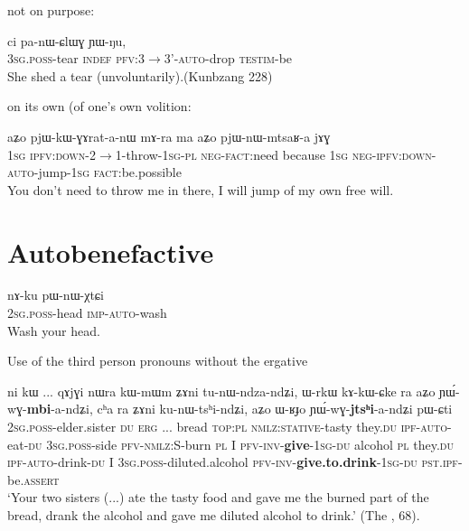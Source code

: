 \documentclass[oldfontcommands,oneside,a4paper,11pt]{article}
\newcommand{\ipa}[1]{{\phon \mbox{#1}}} %
\begin{document}
not on purpose:


\begin{exe}
\ex
\gll \ipa{ɯ-qom} 	\ipa{ci} 	\ipa{pa-nɯ-ɕlɯɣ} 	\ipa{ɲɯ-ŋu,} \\
\textsc{3sg.poss}-tear \textsc{indef} \textsc{pfv:3$\rightarrow$3'-auto}-drop \textsc{testim}-be \\
\glt She shed a tear (unvoluntarily).(Kunbzang 228)
\end{exe}


on its own (of one's own volition:

\begin{exe}
\ex
\gll 
\ipa{aʑo} 	\ipa{pjɯ-kɯ-ɣɤrat-a-nɯ} 	\ipa{mɤ-ra} 	\ipa{ma} 	\ipa{aʑo} 	\ipa{pjɯ-nɯ-mtsaʁ-a} 	\ipa{jɤɣ} \\
\textsc{1sg} \textsc{ipfv:down}-2$\rightarrow$1-throw-\textsc{1sg-pl} \textsc{neg-fact}:need because \textsc{1sg} \textsc{neg-ipfv:down-auto}-jump-\textsc{1sg} \textsc{fact}:be.possible \\
\glt You don't need to throw me in there, I will jump of my own free will.
\end{exe}


\section{Autobenefactive}

\begin{exe}
\ex
\gll 
\ipa{nɤ-ku} 	\ipa{pɯ-nɯ-χtɕi} \\
\textsc{2sg.poss}-head \textsc{imp-auto}-wash \\
\glt Wash your head.
\end{exe}

Use of the third person pronouns without the ergative

   \begin{exe}
\ex \label{ex:secundative}
\gll  \ipa{nɤ-pi}   	\ipa{ni}   	\ipa{kɯ}   	...   	\ipa{qɤjɣi}   	\ipa{nɯra}   	\ipa{kɯ-mɯm}   	\ipa{ʑɤni}   	\ipa{tu-nɯ-ndza-ndʑi,}   	\ipa{ɯ-rkɯ}   	\ipa{kɤ-kɯ-ɕke}   	\ipa{ra}   	\ipa{aʑo}   	\ipa{ɲɯ́-wɣ-\textbf{mbi}-a-ndʑi,}   	\ipa{cʰa}   	\ipa{ra}   	\ipa{ʑɤni}   	\ipa{ku-nɯ-tsʰi-ndʑi,}   	\ipa{aʑo}   	\ipa{ɯ-ʁɟo}   	\ipa{ɲɯ́-wɣ-\textbf{jtsʰi}-a-ndʑi}   	\ipa{pɯ-ɕti}        \\
\textsc{2sg.poss}-elder.sister \textsc{du} \textsc{erg} ... bread \textsc{top:pl} \textsc{nmlz:stative}-tasty they.\textsc{du} \textsc{ipf}-\textsc{auto}-eat-\textsc{du} \textsc{3sg.poss}-side \textsc{pfv}-\textsc{nmlz:S}-burn \textsc{pl}  I \textsc{pfv}-\textsc{inv}-\textbf{give}-\textsc{1sg}-\textsc{du} alcohol \textsc{pl} they.\textsc{du} \textsc{ipf}-\textsc{auto}-drink-\textsc{du} I \textsc{3sg.poss}-diluted.alcohol \textsc{pfv}-\textsc{inv}-\textbf{give.to.drink}-\textsc{1sg}-\textsc{du} \textsc{pst.ipf}-be.\textsc{assert}  \\
 \glt    `Your two sisters (...) ate the tasty food and gave me the burned part of the bread, drank the alcohol and gave me diluted alcohol to drink.'  (The , 68).
\end{exe} 
\end{document}
